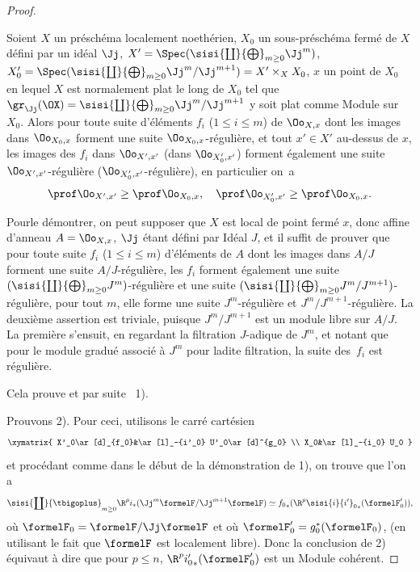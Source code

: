 \begin{proof}
\begin{lemme} \label{XII.4.2}
Soient $X$ un pr\'esch\'ema localement noeth\'erien, $X_0$ un sous-pr\'esch\'ema ferm\'e de $X$ d\'efini par un id\'eal $\Jj$, $X'=\Spec(\sisi{\coprod}{\bigoplus}_{m\geq 0} \Jj^m)$, $X_0'=\Spec(\sisi{\coprod}{\bigoplus}_{m\geq 0} \Jj^m/\Jj^{m+1}) = X'\times_XX_0$, $x$ un point de $X_0$ en lequel $X$ est normalement plat le long de $X_0$ \ie tel que $\gr_{\Jj}(\OX)= \sisi{\coprod}{\bigoplus}_{m\geq 0}\Jj^m/\Jj^{m+1}$ y soit plat comme Module sur $X_0$. Alors pour toute suite d'\'el\'ements $f_i$ ($1\leq i\leq m$) de $\Oo_{X, x}$ dont les images dans $\Oo_{X_0, x}$ forment une suite $\Oo_{X_0, x}$-r\'eguli\`ere, et tout $x'\in X'$ au-dessus de $x$, les images des $f_i$ dans $\Oo_{X', x'}$ (\resp dans $\Oo_{X'_0, x'}$) forment \'egalement une suite $\Oo_{X', x'}$-r\'eguli\`ere (\resp $\Oo_{X'_0, x'}$-r\'eguli\`ere), en particulier on~a
\steco
\begin{equation} \label{eq:XII.23}
\prof \Oo_{X', x'} \geq \prof \Oo_{X_0, x}, \quad \prof \Oo_{X'_0, x'} \geq \prof \Oo_{X_0, x}.
\end{equation}
\end{lemme}

Pour\pageoriginale le d\'emontrer, on peut supposer que $X$ est local de point ferm\'e $x$, donc affine d'anneau $A=\Oo_{X, x}$, $\Jj$ \'etant d\'efini par Id\'eal $J$, et il suffit de prouver que pour toute suite $f_i$ ($1\leq i\leq m$) d'\'el\'ements de $A$ dont les images dans $A/J$ forment une suite $A/J$-r\'eguli\`ere, les $f_i$ forment \'egalement une suite $(\sisi{\coprod}{\bigoplus}_{m\geq 0} J^m)$-r\'eguli\`ere et une suite $(\sisi{\coprod}{\bigoplus}_{m\geq 0} J^m/J^{m+1})$-r\'eguli\`ere, \ie pour tout $m$, elle forme une suite $J^m$-r\'eguli\`ere et $J^m/J^{m+1}$-r\'eguli\`ere. La deuxi\`eme assertion est triviale, puisque $J^m/J^{m+1}$ est un module libre sur $A/J$. La premi\`ere s'ensuit, en regardant la filtration $J$-adique de $J^m$, et notant que pour le module gradu\'e associ\'e \`a $J^m$ pour ladite filtration, la suite des~$f_i$ est r\'eguli\`ere.

Cela prouve  et par suite ~1\sisi{\noo}{}).

Prouvons  2\sisi{\noo}{}). Pour ceci, utilisons le carr\'e cart\'esien
\[
\xymatrix{
X'_0\ar[d]_{f_0}&\ar[l]_-{i'_0} U'_0\ar[d]^{g_0} \\
X_0&\ar[l]_-{i_0} U_0
}
\]
et proc\'edant comme dans le d\'ebut de la d\'emonstration de 1\sisi{\noo}{}), on trouve que l'on a
\steco
\begin{equation} \label{eq:XII.24}
\sisi{\coprod}{\tbigoplus}_{m\geq 0} \R^pi_\ast(\Jj^m\formelF/\Jj^{m+1}\formelF) \simeq {f_0}_\ast (\R^p{\sisi{i}{i'}_0}_\ast(\formelF_0')),
\end{equation}
o\`u $\formelF_0=\formelF/\Jj\formelF$ et o\`u $\formelF_0'=g_0^\ast(\formelF_0)$, (en utilisant le fait que $\formelF$ est localement libre). Donc la conclusion de 2\sisi{\noo}{}) \'equivaut \`a dire que pour $p\leq n$, $\R^p{i'_0}_\ast(\formelF_0')$ est un Module coh\'erent.


\end{proof}
